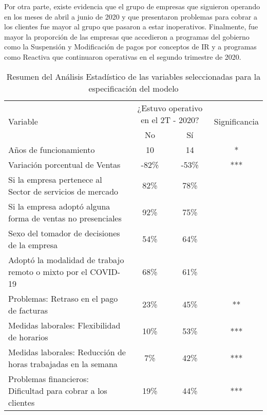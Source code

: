 \documentclass[12pt]{article}
\begin{document}
        Por otra parte, existe evidencia que el grupo de empresas que siguieron operando en los meses de abril a junio de 2020
        y que presentaron problemas para cobrar a los clientes fue mayor al grupo que pasaron a estar inoperativos.
        Finalmente, fue mayor la proporción de las empresas que accedieron a programas del gobierno como la Suspensión y
        Modificación de pagos por conceptos de IR y a programas como Reactiva que continuaron operativas en el
        segundo trimestre de 2020.
            \begin{table}[H]
                \raggedright
                \caption{Resumen del Análisis Estadístico de las variables seleccionadas para la especificación del modelo}
                \begin{tabular}{m{7.5cm}ccc}
                    \toprule
                    \multirow{2}{*}{Variable} &  \multicolumn{2}{c}{¿Estuvo operativo en el 2T - 2020?}  & \multirow{2}{*}{Significancia} \\
                    \cline{2-3}  & No & Sí & \\
                    \midrule
                    Años de funcionamiento & 10 & 14 & * \\
                    \hline
                     Variación porcentual de Ventas & -82\% & -53\%  & *** \\
                    \hline
                    Si la empresa pertenece al Sector de servicios de mercado  & 82\%  & 78\%  &  \\
                    \hline
                    Si la empresa adoptó alguna forma de ventas no presenciales & 92\% & 75\% &  \\
                    \hline
                    Sexo del tomador de decisiones de la empresa & 54\% & 64\%  &  \\
                    \hline
                    Adoptó la modalidad de trabajo remoto o mixto por el COVID-19 & 68\% & 61\%  &  \\
                    \hline
                    Problemas: Retraso en el pago de facturas & 23\% & 45\%  & ** \\
                    \hline
                    Medidas laborales: Flexibilidad de horarios & 10\% & 53\%  & *** \\
                    \hline
                    Medidas laborales: Reducción de horas trabajadas en la semana & 7\% & 42\%  & *** \\
                    \hline
                    Problemas financieros: Dificultad para cobrar a los clientes & 19\% & 44\%  & *** \\

\end{tabular}
\end{table}
\end{document}
